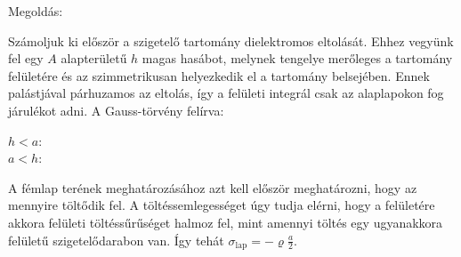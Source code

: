 
\ifdefined\megoldas

 Megoldás: 

 Számoljuk ki először a szigetelő tartomány dielektromos eltolását. Ehhez vegyünk fel egy $A$ alapterületű $h$ magas hasábot, melynek tengelye merőleges a tartomány felületére és az szimmetrikusan helyezkedik el a tartomány belsejében. Ennek palástjával párhuzamos az eltolás, így a felületi integrál csak az alaplapokon fog járulékot adni. A Gauss-törvény felírva:
 \begin{description}
   \item[$h<a$:] 
   \item[$a<h$:]
 \end{description}

 A fémlap terének meghatározásához azt kell először meghatározni, hogy az mennyire töltődik fel. A töltéssemlegességet úgy tudja elérni, hogy a felületére akkora felületi töltéssűrűséget halmoz fel, mint amennyi töltés egy ugyanakkora felületű szigetelődarabon van. Így tehát $\sigma_\text{lap}=-\varrho \frac{a}{2}$.

